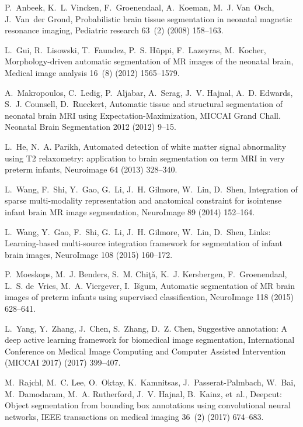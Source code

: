 \documentclass[twoside,espcrc2]{elsarticle}
\begin{document}
\begin{thebibliography}{10}
P.~Anbeek, K.~L. Vincken, F.~Groenendaal, A.~Koeman, M.~J. Van~Osch, J.~Van~der
  Grond, Probabilistic brain tissue segmentation in neonatal magnetic resonance
  imaging, Pediatric research 63~(2) (2008) 158--163.

L.~Gui, R.~Lisowski, T.~Faundez, P.~S. H{\"u}ppi, F.~Lazeyras, M.~Kocher,
  Morphology-driven automatic segmentation of {MR} images of the neonatal
  brain, Medical image analysis 16~(8) (2012) 1565--1579.

A.~Makropoulos, C.~Ledig, P.~Aljabar, A.~Serag, J.~V. Hajnal, A.~D. Edwards,
  S.~J. Counsell, D.~Rueckert, Automatic tissue and structural segmentation of
  neonatal brain {MRI} using {E}xpectation-{M}aximization, MICCAI Grand Chall.
  Neonatal Brain Segmentation 2012 (2012) 9--15.

L.~He, N.~A. Parikh, Automated detection of white matter signal abnormality
  using {T2} relaxometry: application to brain segmentation on term {MRI} in
  very preterm infants, Neuroimage 64 (2013) 328--340.

L.~Wang, F.~Shi, Y.~Gao, G.~Li, J.~H. Gilmore, W.~Lin, D.~Shen, Integration of
  sparse multi-modality representation and anatomical constraint for isointense
  infant brain {MR} image segmentation, NeuroImage 89 (2014) 152--164.

L.~Wang, Y.~Gao, F.~Shi, G.~Li, J.~H. Gilmore, W.~Lin, D.~Shen, Links:
  Learning-based multi-source integration framework for segmentation of infant
  brain images, NeuroImage 108 (2015) 160--172.

P.~Moeskops, M.~J. Benders, S.~M. Chi{\c{t}}ǎ, K.~J. Kersbergen,
  F.~Groenendaal, L.~S. de~Vries, M.~A. Viergever, I.~I{\v{s}}gum, Automatic
  segmentation of {MR} brain images of preterm infants using supervised
  classification, NeuroImage 118 (2015) 628--641.

L.~Yang, Y.~Zhang, J.~Chen, S.~Zhang, D.~Z. Chen, Suggestive annotation: A deep
  active learning framework for biomedical image segmentation, International
  Conference on Medical Image Computing and Computer Assisted Intervention
  (MICCAI 2017) (2017) 399--407.

M.~Rajchl, M.~C. Lee, O.~Oktay, K.~Kamnitsas, J.~Passerat-Palmbach, W.~Bai,
  M.~Damodaram, M.~A. Rutherford, J.~V. Hajnal, B.~Kainz, et~al., Deepcut:
  Object segmentation from bounding box annotations using convolutional neural
  networks, IEEE transactions on medical imaging 36~(2) (2017) 674--683.


\end{thebibliography}
\end{document}
